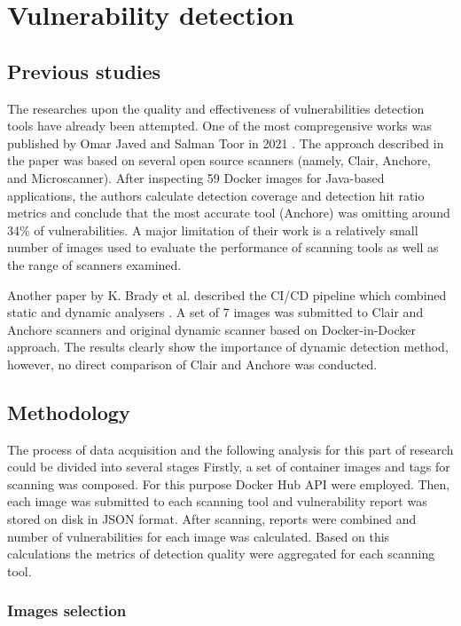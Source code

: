 \section{Vulnerability detection}

\subsection{Previous studies}

The researches upon the quality and effectiveness of vulnerabilities detection tools have already been attempted. One of the most compregensive works was published by Omar Javed and Salman Toor in 2021 \cite{arxiv:1}. The approach described in the paper was based on several open source scanners (namely, Clair, Anchore, and Microscanner). After inspecting 59 Docker images for Java-based applications, the authors calculate detection coverage and detection hit ratio metrics and conclude that the most accurate tool (Anchore) was omitting around 34\% of vulnerabilities. A major limitation of their work is a relatively small number of images used to evaluate the performance of scanning tools as well as the range of scanners examined.

Another paper by K. Brady et al. described the CI/CD pipeline which combined static and dynamic analysers \cite{c:2}. A set of 7 images was submitted to Clair and Anchore scanners and original dynamic scanner based on Docker-in-Docker approach. The results clearly show the importance of dynamic detection method, however, no direct comparison of Clair and Anchore was conducted.

\subsection{Methodology}
The process of data acquisition and the following analysis for this part of research could be divided into several stages Firstly, a set of container images and tags for scanning was composed. For this purpose Docker Hub API were employed. Then, each image was submitted to each scanning tool and vulnerability report was stored on disk in JSON format. After scanning, reports were combined and number of vulnerabilities for each image was calculated. Based on this calculations the metrics of detection quality were aggregated for each scanning tool.

\subsubsection{Images selection}

